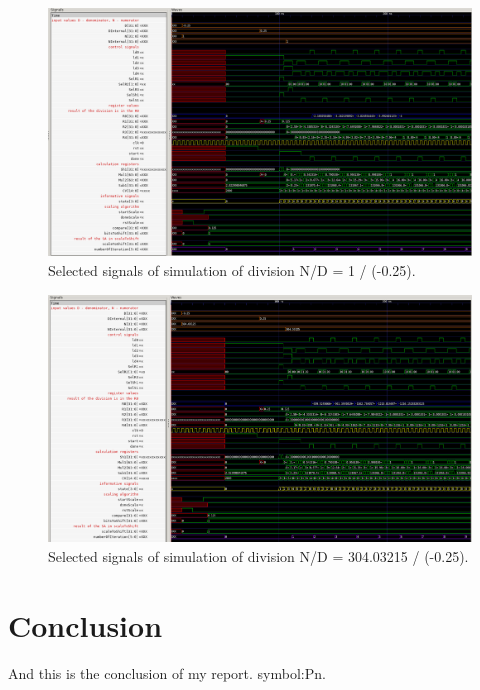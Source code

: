 \documentclass[a4paper, twoside, 11pt]{article}
\begin{document}
\begin{figure}[htbp!]
  \centering
  \includegraphics[width=1\textwidth]{src/png/division-1-div-minus-0-25.png}
    \caption{Selected signals of simulation of division N/D = 1 / (-0.25).}
  \label{fig:division-1-div-minus-0-25}
\end{figure}


\begin{figure}[htbp!]
  \centering
  \includegraphics[width=1\textwidth]{src/png/division-304-03215-div-min-0-25.png}
    \caption{Selected signals of simulation of division N/D = 304.03215 / (-0.25).}
  \label{fig:division-304-03215-div-min-0-25}
\end{figure}

\newpage
{} 
\section*{Conclusion}
And this is the conclusion of my report. \gls{symbol:Pn}.

\flushbottom %
\end{document}
